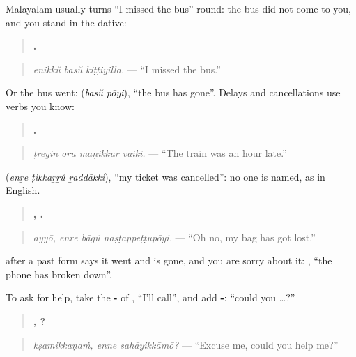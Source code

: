 \begin{grammarlens}[title={Grammar Lens: it did not come to me}]
Malayalam usually turns \textquotedblleft{}I missed the bus\textquotedblright{} round: the bus did not come to you, and you stand in the dative:

\begin{quote}
\textbf{  .}
\end{quote}

\begin{quote}
\emph{enikkŭ basŭ kiṭṭiyilla.} — \textquotedblleft{}I missed the bus.\textquotedblright{}
\end{quote}

Or the bus went: \textbf{ } (\emph{basŭ pōyi}), \textquotedblleft{}the bus has gone\textquotedblright{}. Delays and cancellations use verbs you know:

\begin{quote}
\textbf{   .}
\end{quote}

\begin{quote}
\emph{ṭreyin oru maṇikkūr vaiki.} — \textquotedblleft{}The train was an hour late.\textquotedblright{}
\end{quote}

\textbf{  } (\emph{enṟe ṭikkaṟṟŭ ṟaddākki}), \textquotedblleft{}my ticket was cancelled\textquotedblright{}: no one is named, as in English.
\end{grammarlens}

\begin{grammarlens}[title={Grammar Lens: lost and broken, and help}]
\begin{quote}
\textbf{,   .}
\end{quote}

\begin{quote}
\emph{ayyō, enṟe bāgŭ naṣṭappeṭṭupōyi.} — \textquotedblleft{}Oh no, my bag has got lost.\textquotedblright{}
\end{quote}

\textbf{} after a past form says it went and is gone, and you are sorry about it: \textbf{ }, \textquotedblleft{}the phone has broken down\textquotedblright{}.

To ask for help, take the \textbf{-} of \textbf{}, \textquotedblleft{}I'll call\textquotedblright{}, and add \textbf{-}: \textquotedblleft{}could you …?\textquotedblright{}

\begin{quote}
\textbf{,  ?}
\end{quote}

\begin{quote}
\emph{kṣamikkaṇaṁ, enne sahāyikkāmō?} — \textquotedblleft{}Excuse me, could you help me?\textquotedblright{}
\end{quote}
\end{grammarlens}

